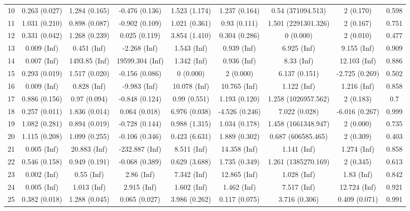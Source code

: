\begin{tabular}{@{\extracolsep{5pt}} l cccccccc}
10 & 0.263 (0.027) & 1.284 (0.165) & -0.476 (0.136) & 1.523 (1.174) & 1.237 (0.164) & 0.54 (371094.513) & 2 (0.170) & 0.598 \\ 
11 & 1.031 (0.210) & 0.898 (0.087) & -0.902 (0.109) & 1.021 (0.361) & 0.93 (0.111) & 1.501 (2291301.326) & 2 (0.167) & 0.751 \\ 
12 & 0.331 (0.042) & 1.268 (0.239) & 0.025 (0.119) & 3.854 (1.410) & 0.304 (0.286) & 0 (0.000) & 2 (0.010) & 0.477 \\ 
13 & 0.009 (Inf) & 0.451 (Inf) & -2.268 (Inf) & 1.543 (Inf) & 0.939 (Inf) & 6.925 (Inf) & 9.155 (Inf) & 0.909 \\ 
14 & 0.007 (Inf) & 1493.85 (Inf) & 19599.304 (Inf) & 1.342 (Inf) & 0.936 (Inf) & 8.33 (Inf) & 12.103 (Inf) & 0.886 \\ 
15 & 0.293 (0.019) & 1.517 (0.020) & -0.156 (0.086) & 0 (0.000) & 2 (0.000) & 6.137 (0.151) & -2.725 (0.269) & 0.502 \\ 
16 & 0.009 (Inf) & 0.828 (Inf) & -9.983 (Inf) & 10.078 (Inf) & 10.765 (Inf) & 1.122 (Inf) & 1.216 (Inf) & 0.858 \\ 
17 & 0.886 (0.156) & 0.97 (0.094) & -0.848 (0.124) & 0.99 (0.551) & 1.193 (0.120) & 1.258 (1026957.562) & 2 (0.183) & 0.7 \\ 
18 & 0.257 (0.011) & 1.836 (0.014) & 0.064 (0.018) & 6.976 (0.038) & -4.526 (0.246) & 7.022 (0.028) & -6.016 (0.267) & 0.999 \\ 
19 & 1.082 (0.281) & 0.894 (0.019) & -0.728 (0.144) & 0.988 (1.315) & 1.034 (0.178) & 1.458 (1661348.947) & 2 (0.000) & 0.735 \\ 
20 & 1.115 (0.208) & 1.099 (0.255) & -0.106 (0.346) & 0.423 (6.631) & 1.889 (0.302) & 0.687 (606585.465) & 2 (0.309) & 0.403 \\ 
21 & 0.005 (Inf) & 20.883 (Inf) & -232.887 (Inf) & 8.511 (Inf) & 14.358 (Inf) & 1.141 (Inf) & 1.274 (Inf) & 0.858 \\ 
22 & 0.546 (0.158) & 0.949 (0.191) & -0.068 (0.389) & 0.629 (3.688) & 1.735 (0.349) & 1.261 (1385270.169) & 2 (0.345) & 0.613 \\ 
23 & 0.002 (Inf) & 0.55 (Inf) & 2.86 (Inf) & 7.342 (Inf) & 12.865 (Inf) & 1.028 (Inf) & 1.83 (Inf) & 0.842 \\ 
24 & 0.005 (Inf) & 1.013 (Inf) & 2.915 (Inf) & 1.602 (Inf) & 1.462 (Inf) & 7.517 (Inf) & 12.724 (Inf) & 0.921 \\ 
25 & 0.382 (0.018) & 1.288 (0.045) & 0.065 (0.027) & 3.986 (0.262) & 0.117 (0.075) & 3.716 (0.306) & 0.409 (0.071) & 0.991 \\ 

\end{tabular}
